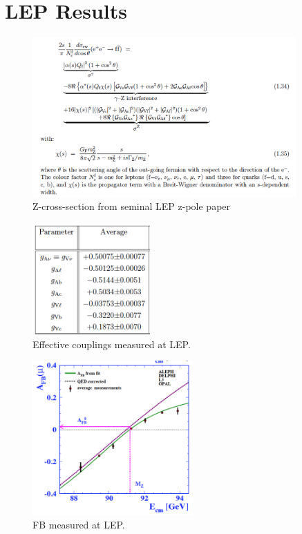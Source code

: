 \documentclass[12pt]{article}
\begin{document}
\section{LEP Results}

\begin{figure}[htbp]
\begin{center}
\includegraphics[width=0.90\textwidth]{figs/lep_xsec.png}
\end{center}
\caption{\label{fig:lepans} Z-cross-section from seminal LEP z-pole paper}
\end{figure}

\begin{figure}[htbp]
\begin{center}
\includegraphics[width=0.40\textwidth]{figs/lep_couplings_quarks.png}
\end{center}
\caption{\label{fig:lepcouplling} Effective couplings measured at LEP.}
\end{figure}

\begin{figure}[htbp]
\begin{center}
\includegraphics[width=0.55\textwidth]{figs/lep_fwbw.png}
\end{center}
\caption{\label{fig:lepfwbw} FB measured at LEP.}
\end{figure}
\end{document}
